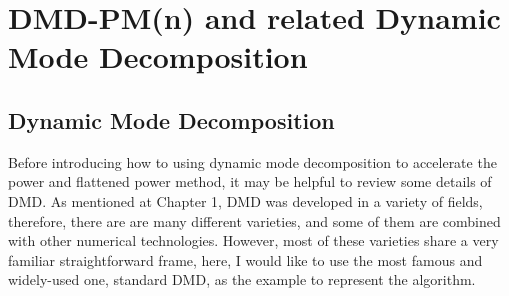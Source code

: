 \cleardoublepage

\chapter{DMD-PM(n) and related Dynamic Mode Decomposition}
\label{chapter:DMD-PM}
\section{Dynamic Mode Decomposition}
Before introducing how to using dynamic mode decomposition to accelerate the power and flattened power method, it may be helpful to review some details of DMD.
As mentioned at Chapter 1, DMD was developed in a variety of fields, therefore, there are are many different varieties, and some of them are combined with other numerical technologies. 
However, most of these varieties share a very familiar straightforward frame, here, I would like to use the most famous and widely-used one, standard DMD, as the example to represent the algorithm. 

